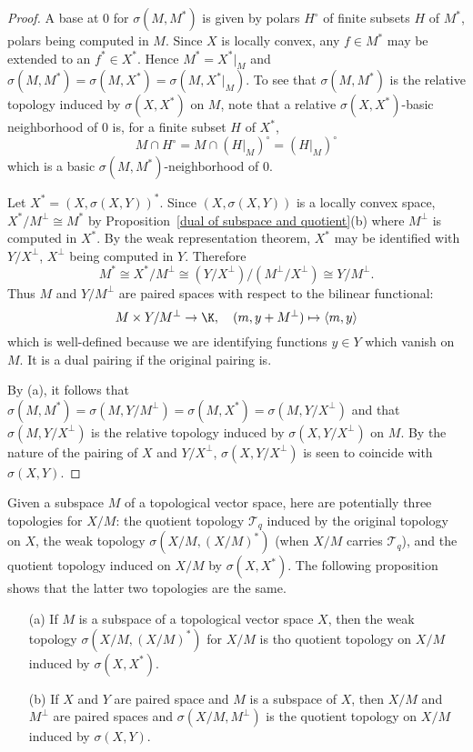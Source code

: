 \begin{proof}
A base at $0$ for $\sigma(M,M^*)$ is given by polars $H^\circ$ of finite subsets $H$ of $M^*$, polars being computed in $M$. Since $X$ is locally convex, any $f\in M^*$ may be extended to an $f^*\in X^*$. Hence $M^*=X^*|_M$ and $\sigma(M,M^*)=\sigma(M,X^*)=\sigma(M,X^*|_M)$. To see that $\sigma(M,M^*)$ is the relative topology induced by $\sigma(X,X^*)$ on $M$, note that a relative $\sigma(X,X^*)$-basic neighborhood of $0$ is, for a finite subset $H$ of $X^*$,
\[M\cap H^\circ=M\cap (H|_M)^\circ=(H|_M)^\circ\]
which is a basic $\sigma(M,M^*)$-neighborhood of $0$.\par
Let $X^*=(X,\sigma(X,Y))^*$. Since $(X,\sigma(X,Y))$ is a locally convex space, $X^*/M^\bot\cong M^*$ by Proposition~\ref{dual of subspace and quotient}(b) where $M^\bot$ is computed in $X^*$. By the weak representation theorem, $X^*$ may be identified with $Y/X^\bot$, $X^\bot$ being computed in $Y$. Therefore
\[M^*\cong X^*/M^\bot\cong(Y/X^\bot)/(M^\bot/X^\bot)\cong Y/M^\bot.\]
Thus $M$ and $Y/M^\bot$ are paired spaces with respect to the bilinear functional:
\[M\times Y/M^\bot\to\K,\quad (m,y+M^\bot)\mapsto \langle m,y\rangle\]
which is well-defined because we are identifying functions $y\in Y$ which vanish on $M$. It is a dual pairing if the original pairing is.\par
By (a), it follows that $\sigma(M,M^*)=\sigma(M,Y/M^\bot)=\sigma(M,X^*)=\sigma(M,Y/X^\bot)$ and that $\sigma(M,Y/X^\bot)$ is the relative topology induced by $\sigma(X,Y/X^\bot)$ on $M$. By the nature of the pairing of $X$ and $Y/X^\bot$, $\sigma(X,Y/X^\bot)$ is seen to coincide with $\sigma(X,Y)$.
\end{proof}
Given a subspace $M$ of a topological vector space, here are potentially three topologies for $X/M$: the quotient topology $\mathcal{T}_q$ induced by the original topology on $X$, the weak topology $\sigma(X/M,(X/M)^*)$ (when $X/M$ carries $\mathcal{T}_q$), and the quotient topology induced on $X/M$ by $\sigma(X,X^*)$. The following proposition shows that the latter two topologies are the same.
\begin{proposition}\label{weak topo quotient}
\mbox{}
\begin{itemize}
\item[(a)] If $M$ is a subspace of a topological vector space $X$, then the weak topology $\sigma(X/M,(X/M)^*)$ for $X/M$ is tho quotient topology on $X/M$ induced by $\sigma(X,X^*)$.
\item[(b)] If $X$ and $Y$ are paired space and $M$ is a subspace of $X$, then $X/M$ and $M^\bot$ are paired spaces and $\sigma(X/M,M^\bot)$ is the quotient topology on $X/M$ induced by $\sigma(X,Y)$.
\end{itemize}
\end{proposition}
